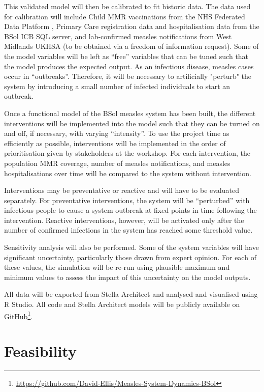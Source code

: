 \documentclass{article}
\begin{document}
This validated model will then be calibrated to fit historic data. The data used for calibration will include Child MMR vaccinations from the NHS Federated Data Platform \cite{NHSEngland2026FDP}, Primary Care registration data and hospitalisation data from the BSol ICB SQL server, and lab-confirmed measles notifications from West Midlands UKHSA (to be obtained via a freedom of information request). Some of the model variables will be left as “free” variables that can be tuned such that the model produces the expected output. As an infectious disease, measles cases occur in “outbreaks”. Therefore, it will be necessary to artificially "perturb" the system by introducing a small number of infected individuals to start an outbreak.

Once a functional model of the BSol measles system has been built, the different interventions will be implemented into the model such that they can be turned on and off, if necessary, with varying “intensity”. To use the project time as efficiently as possible, interventions will be implemented in the order of prioritisation given by stakeholders at the workshop. For each intervention, the population MMR coverage, number of measles notifications, and measles hospitalisations over time will be compared to the system without intervention.

Interventions may be preventative or reactive and will have to be evaluated separately. For preventative interventions, the system will be “perturbed” with infectious people to cause a system outbreak at fixed points in time following the intervention. Reactive interventions, however, will be activated only after the number of confirmed infections in the system has reached some threshold value.

Sensitivity analysis will also be performed. Some of the system variables will have significant uncertainty, particularly those drawn from expert opinion. For each of these values, the simulation will be re-run using plausible maximum and minimum values to assess the impact of this uncertainty on the model outputs.

All data will be exported from Stella Architect and analysed and visualised using R Studio. All code and Stella Architect models will be publicly available on GitHub\footnote{\href{https://github.com/David-Ellis/Measles-System-Dynamics-BSol}{https://github.com/David-Ellis/Measles-System-Dynamics-BSol}}.

\section{Feasibility}
\end{document}
